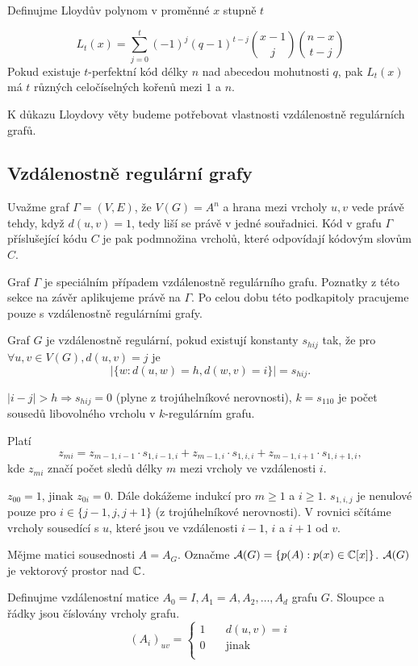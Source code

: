 \vt Definujme Lloydův polynom v proměnné $x$ stupně $t$

\begin{displaymath}
	L_t(x) = \sum_{j=0}^t(-1)^j(q-1)^{t-j}\binom{x-1}{j}\binom{n-x}{t-j}
\end{displaymath}
Pokud existuje $t$-perfektní kód délky $n$ nad abecedou mohutnosti $q$, pak $L_t(x)$  má $t$ různých celočíselných kořenů mezi $1$ a $n$.

K důkazu Lloydovy věty budeme potřebovat vlastnosti vzdálenostně regulárních grafů. 

\subsection{Vzdálenostně regulární grafy}


\df Uvažme graf $\Gamma=(V,E)$, že $V(G) = A^n$ a hrana mezi vrcholy $u,v$ vede právě tehdy, když $d(u, v) = 1$, tedy liší se právě v jedné souřadnici. Kód v grafu $\Gamma$ příslušející kódu $C$ je pak podmnožina vrcholů, které odpovídají kódovým slovům $C$.

Graf $\Gamma$ je speciálním případem vzdálenostně regulárního grafu. Poznatky z této sekce na závěr aplikujeme právě na $\Gamma$. Po celou dobu této podkapitoly pracujeme pouze s vzdálenostně regulárními grafy.

\df Graf $G$ je vzdálenostně regulární, pokud existují konstanty $s_{hij}$ tak, že  pro $\forall u,v\in V(G), d(u,v) = j$ je $$|\{w: d(u,w) = h, d(w,v) = i\}| = s_{hij}.$$

\poz $|i-j| > h \Rightarrow s_{hij} = 0$ (plyne z trojúhelníkové nerovnosti), $k = s_{110}$ je počet sousedů libovolného vrcholu v $k$-regulárním grafu. 

\lm Platí $$z_{mi} = z_{m-1,i-1} \cdot s_{1,i-1,i} + z_{m-1,i} \cdot s_{1,i,i} + z_{m-1,i+1} \cdot s_{1,i+1,i},$$ kde $z_{mi}$ značí počet sledů délky $m$ mezi vrcholy ve vzdálenosti $i$.

\dk $z_{00} = 1$, jinak $z_{0i} = 0$. Dále dokážeme indukcí pro $m \ge 1$ a $i
\ge 1$. $s_{1,i,j}$ je nenulové pouze pro $i \in \{j-1,j,j+1\}$ (z trojúhelníkové
nerovnosti). V rovnici sčítáme vrcholy sousedící s $u$, které jsou ve
vzdálenosti $i-1$, $i$ a $i+1$ od $v$.

\df Mějme matici sousednosti $A = A_G$. Označme $\mathcal{A}(G) = \{p(A): p(x) \in \mathbb{C}[x]\}$. $\mathcal{A}(G)$ je
vektorový prostor nad $\mathbb{C}$.



\df Definujme vzdálenostní matice $A_0=I, A_1=A, A_2, \dots, A_d$ grafu $G$. Sloupce a řádky jsou číslovány vrcholy grafu. \\
$$(A_i)_{uv} = \left\{\begin{matrix}
1\quad & d(u,v) = i  \\
0\quad & \text{jinak} \\
\end{matrix}\right.$$


